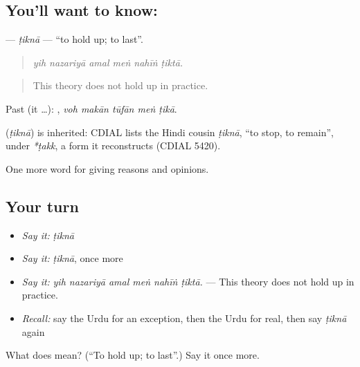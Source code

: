 \subsection*{You'll want to know: }
\textbf{} — \emph{ṭiknā} — \textquotedblleft{}to hold up; to last\textquotedblright{}.

\begin{quote}
     
\end{quote}

\begin{quote}
\emph{yih nazariyā amal meṅ nahīṅ ṭiktā.}
\end{quote}

\begin{quote}
This theory does not hold up in practice.
\end{quote}

Past (it …):     , \emph{voh makān tūfān meṅ ṭikā}.

\begin{cousinweb}
\textbf{} (\emph{ṭiknā}) is inherited: CDIAL lists the Hindi cousin \emph{ṭiknā}, \textquotedblleft{}to stop, to remain\textquotedblright{}, under \emph{*ṭakk}, a form it reconstructs (CDIAL 5420).
\end{cousinweb}

\begin{grammarlens}[title={What you've built}]
One more word for giving reasons and opinions.
\end{grammarlens}

\subsection*{Your turn}
\begin{itemize}
\raggedright
  \item \emph{Say it:} \emph{ṭiknā}
  \item \emph{Say it:} \emph{ṭiknā}, once more
  \item \emph{Say it:} \emph{yih nazariyā amal meṅ nahīṅ ṭiktā.} — This theory does not hold up in practice.
  \item \emph{Recall:} say the Urdu for an exception, then the Urdu for real, then say \emph{ṭiknā} again
\end{itemize}

\begin{tcolorbox}[breakable,colback=teal!4,colframe=teal!35!black,title={Before you move on}]
What does  mean? (\textquotedblleft{}To hold up; to last\textquotedblright{}.) Say it once more.
\end{tcolorbox}
